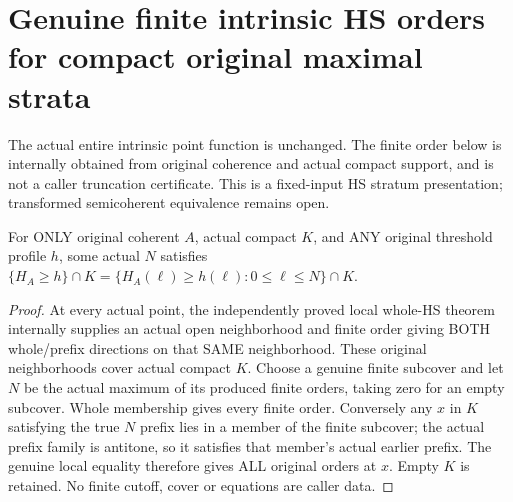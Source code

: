 \section{Genuine finite intrinsic HS orders for compact original maximal strata}

The actual entire intrinsic point function is unchanged. The finite order
below is internally obtained from original coherence and actual compact
support, and is not a caller truncation certificate. This is a fixed-input
HS stratum presentation; transformed semicoherent equivalence remains open.

\begin{lemma}
\label{hir:actual-original-compact-whole-hs-uniform-finite-prefix}
\leanok
For ONLY original coherent $A$, actual compact $K$, and ANY original
threshold profile $h$, some actual $N$ satisfies
$\{H_A\ge h\}\cap K=\{H_A(\ell)\ge h(\ell):0\le\ell\le N\}\cap K$.
\end{lemma}
\begin{proof}
At every actual point, the independently proved local whole-HS theorem
internally supplies an actual open neighborhood and finite order giving
BOTH whole/prefix directions on that SAME neighborhood. These original
neighborhoods cover actual compact $K$. Choose a genuine finite subcover
and let $N$ be the actual maximum of its produced finite orders, taking
zero for an empty subcover. Whole membership gives every finite order.
Conversely any $x$ in $K$ satisfying the true $N$ prefix lies in a member
of the finite subcover; the actual prefix family is antitone, so it
satisfies that member's actual earlier prefix. The genuine local equality
therefore gives ALL original orders at $x$. Empty $K$ is retained.
No finite cutoff, cover or equations are caller data.
\end{proof}

